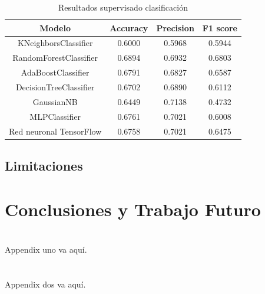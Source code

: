 \documentclass{wsdcr}
\begin{document}
\begin{table}[t]
    \begin{center}
        \begin{tabular}{| c | c | c | c | }\hline
            Modelo                  & Accuracy & Precision & F1 score \\ \hline
            KNeighborsClassifier    & 0.6000   & 0.5968    & 0.5944   \\
            RandomForestClassifier  & 0.6894   & 0.6932    & 0.6803   \\
            AdaBoostClassifier      & 0.6791   & 0.6827    & 0.6587   \\
            DecisionTreeClassifier  & 0.6702   & 0.6890    & 0.6112   \\
            GaussianNB              & 0.6449   & 0.7138    & 0.4732   \\
            MLPClassifier           & 0.6761   & 0.7021    & 0.6008   \\
            Red neuronal TensorFlow & 0.6758   & 0.7021    & 0.6475   \\ \hline
        \end{tabular}
        \caption{Resultados supervisado clasificación}
        \label{tab:resultados supervisado clasificacion}
    \end{center}
\end{table}

\subsection{Limitaciones}

\section{Conclusiones y Trabajo Futuro}

\appendices
\section{}
Appendix uno va aquí.

\section{}
Appendix dos va aquí.




\end{document}
